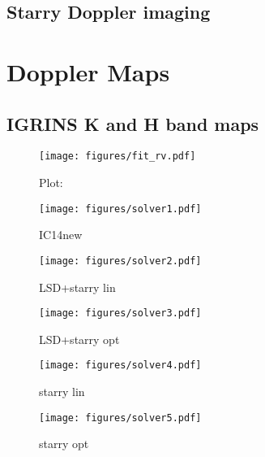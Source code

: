 \documentclass[twocolumn]{aastex631}
\begin{document}
\subsection{Starry Doppler imaging}


\section{Doppler Maps}

\subsection{IGRINS K and H band maps}

\begin{figure}[ht!]
    \begin{centering}
        \texttt{[image: figures/fit\_rv.pdf]}
        \caption{
            Plot: 
        }
        \label{fig:fit_rv}
    \end{centering}
\end{figure}

\begin{figure*}
    \centering
    \begin{subfigure}[b]{0.18\textwidth}
        \centering
        \texttt{[image: figures/solver1.pdf]}
        \caption{IC14new}
        \label{fig:solver1}
     \end{subfigure}
     \hfill
     \begin{subfigure}[b]{0.18\textwidth}
         \centering
         \texttt{[image: figures/solver2.pdf]}
         \caption{LSD+starry lin}
         \label{fig:solver2}
     \end{subfigure}
     \hfill
     \begin{subfigure}[b]{0.18\textwidth}
         \centering
         \texttt{[image: figures/solver3.pdf]}
         \caption{LSD+starry opt}
         \label{fig:solver3}
     \end{subfigure}
     \hfill
     \begin{subfigure}[b]{0.18\textwidth}
         \centering
         \texttt{[image: figures/solver4.pdf]}
         \caption{starry lin}
         \label{fig:solver4}
     \end{subfigure}
     \hfill
     \begin{subfigure}[b]{0.18\textwidth}
         \centering
         \texttt{[image: figures/solver5.pdf]}
         \caption{starry opt}
         \label{fig:solver5}
     \end{subfigure}
\end{figure*} 



\end{document}

